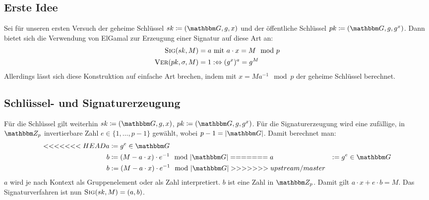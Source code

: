 \subsection{Erste Idee} 
Sei für unseren ersten Versuch der geheime
Schlüssel $\skey \coloneqq (\G, g, x)$ und der öffentliche Schlüssel $\pkey \coloneqq
(\G, g, g^x)$. Dann bietet sich die Verwendung von ElGamal zur Erzeugung
einer Signatur auf diese Art an:
\begin{align*} 
  \textsc{Sig}(sk,M) &= a \text{ mit } a \cdot x = M \mod p \\  
  \textsc{Ver}(pk,\sigma,M) &= 1 :\Leftrightarrow (g^x)^a =  g^M
\end{align*} 
Allerdings lässt sich diese Konstruktion auf einfache Art
brechen, indem mit $x = M a^{-1} \mod p$ der geheime Schlüssel
berechnet.
\subsection{Schlüssel- und Signaturerzeugung} 
Für die Schlüssel gilt weiterhin $\skey \coloneqq (\G, g, x)$, $\pkey \coloneqq (\G, g,
g^x)$.  Für die Signaturerzeugung wird eine zufällige, in $\Z{p}$
invertierbare Zahl $e \in \{1, \dots, p - 1\}$ gewählt, wobei
$p-1=|\G|$. Damit berechnet man:
\begin{align*} 
<<<<<<< HEAD
  a &\coloneqq g^e \in \G\\ 
  b &\coloneqq (M - a \cdot x) \cdot e^{-1} \mod |\G|
=======
  a &:= g^e \in \G\\ 
  b &:= (M - a \cdot x) \cdot e^{-1} \mod |\G|
>>>>>>> upstream/master
\end{align*} 
$a$ wird je nach Kontext als Gruppenelement oder als Zahl interpretiert.
$b$ ist eine Zahl in $\Z{p}$.  Damit gilt $a \cdot x + e \cdot b =
M$. Das Signaturverfahren ist nun $\textsc{Sig}(sk,M) = (a, b)$.

